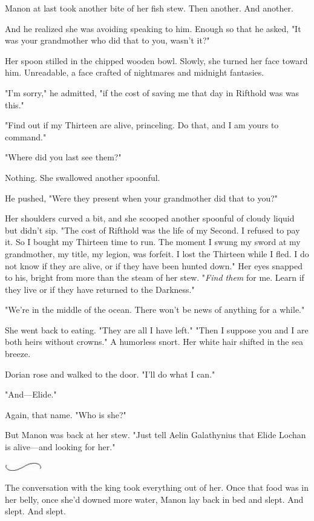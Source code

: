 Manon at last took another bite of her fish stew. Then another. And another.

And he realized she was avoiding speaking to him. Enough so that he asked, "It was your grandmother who did that to you, wasn't it?"

Her spoon stilled in the chipped wooden bowl. Slowly, she turned her face toward him. Unreadable, a face crafted of nightmares and midnight fantasies.

"I'm sorry," he admitted, "if the cost of saving me that day in Rifthold was  was this."

"Find out if my Thirteen are alive, princeling. Do that, and I am yours to command."

"Where did you last see them?"

Nothing. She swallowed another spoonful.

He pushed, "Were they present when your grandmother did that to you?"

Her shoulders curved a bit, and she scooped another spoonful of cloudy liquid but didn't sip. "The cost of Rifthold was the life of my Second. I refused to pay it. So I bought my Thirteen time to run. The moment I swung my sword at my grandmother, my title, my legion, was forfeit. I lost the Thirteen while I fled. I do not know if they are alive, or if they have been hunted down." Her eyes snapped to his, bright from more than the steam of her stew. "\emph{Find them} for me. Learn if they live or if they have returned to the Darkness."

"We're in the middle of the ocean. There won't be news of anything for a while."

She went back to eating. "They are all I have left." "Then I suppose you and I are both heirs without crowns." A humorless snort. Her white hair shifted in the sea breeze.

Dorian rose and walked to the door. "I'll do what I can."

"And---Elide."

Again, that name. "Who is she?"

But Manon was back at her stew. "Just tell Aelin Galathynius that Elide Lochan is alive---and looking for her."

\includegraphics[width=0.65in,height=0.13in]{images/seperator}

The conversation with the king took everything out of her. Once that food was in her belly, once she'd downed more water, Manon lay back in bed and slept. And slept. And slept.

